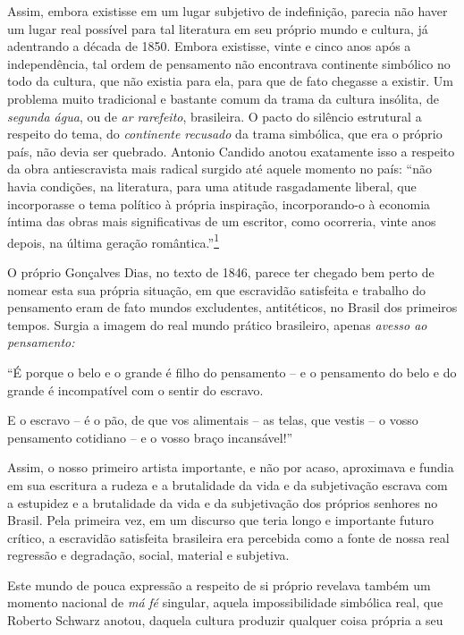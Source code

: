 Assim, embora existisse em um lugar subjetivo de indefinição, parecia
não haver um lugar real possível para tal literatura em seu próprio
mundo e cultura, já adentrando a década de 1850. Embora existisse, vinte
e cinco anos após a independência, tal ordem de pensamento não
encontrava continente simbólico no todo da cultura, que não existia para
ela, para que de fato chegasse a existir. Um problema muito tradicional
e bastante comum da trama da cultura insólita, de \emph{segunda água},
ou de \emph{ar rarefeito}, brasileira. O pacto do silêncio estrutural a
respeito do tema, do \emph{continente recusado} da trama simbólica, que
era o próprio país, não devia ser quebrado. Antonio Candido anotou
exatamente isso a respeito da obra antiescravista mais radical surgido
até aquele momento no país: ``não havia condições, na literatura, para
uma atitude rasgadamente liberal, que incorporasse o tema político à
própria inspiração, incorporando-o à economia íntima das obras mais
significativas de um escritor, como ocorreria, vinte anos depois, na
última geração romântica.''\footnote{\emph{Formação da literatura
  brasileira,} 2º. Volume, \emph{op. cit.}, p. 52.}

O próprio Gonçalves Dias, no texto de 1846, parece ter chegado bem perto
de nomear esta sua própria situação, em que escravidão satisfeita e
trabalho do pensamento eram de fato mundos excludentes, antitéticos, no
Brasil dos primeiros tempos. Surgia a imagem do real mundo prático
brasileiro, apenas \emph{avesso ao pensamento: }

``É porque o belo e o grande é filho do pensamento -- e o pensamento do
belo e do grande é incompatível com o sentir do escravo.

E o escravo -- é o pão, de que vos alimentais -- as telas, que vestis --
o vosso pensamento cotidiano -- e o vosso braço incansável!''

Assim, o nosso primeiro artista importante, e não por acaso, aproximava
e fundia em sua escritura a rudeza e a brutalidade da vida e da
subjetivação escrava com a estupidez e a brutalidade da vida e da
subjetivação dos próprios senhores no Brasil. Pela primeira vez, em um
discurso que teria longo e importante futuro crítico, a escravidão
satisfeita brasileira era percebida como a fonte de nossa real regressão
e degradação, social, material e subjetiva.

Este mundo de pouca expressão a respeito de si próprio revelava também
um momento nacional de \emph{má} \emph{fé} singular, aquela
impossibilidade simbólica real, que Roberto Schwarz anotou, daquela
cultura produzir qualquer coisa própria a seu respeito, como o que fosse
\emph{um Kant do favor} e da escravidão. E, para termos uma medida
global da situação local, olhando para o rápido ponteiro do relógio
simbólico do tic tac mundial em que o país estava situado, e apenas do
ponto de vista da literatura, estamos falando do preciso mesmo tempo
moderno em que, na Europa, Balzac já escrevera \emph{Ilusões perdidas},
Flaubert apresentou \emph{Madame Bovary}, Baudelaire escrevia \emph{As
flores do mal}, de modo a expor com todas as letras a estrutura de
violências, inclusive subjetivas e já inconscientes, da sociedade
burguesa francesa, sempre instável na dinâmica radical da modernidade
que lhe era própria.

